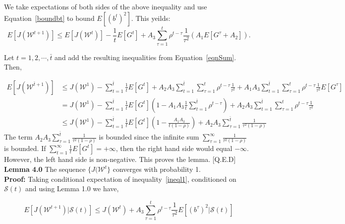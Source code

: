 We take expectations of both sides of the above inequality and use Equation~\ref{boundbt} to bound $E[(b^t)^2]$. This yeilds:
\begin{equation}
\label{eqnSum}
E[J(\mathcal{W}^{t+1})] \le E[J(\mathcal{W}^t)] - \frac{1}{t} E[G^t] + A_3 \sum_{\tau=1}^{t} \rho^{t-\tau} \frac{1}{\tau^2} (A_1 E[G^{\tau} + A_2]).
\end{equation} 

Let $t=1,2,\cdots, \bar{t}$ and add the resulting inequalities from Equation~\ref{eqnSum}. Then,

\begin{align*}
E[J(\mathcal{W}^{\bar{t}+1})] &\le J(\mathcal{W}^1) - \sum_{t=1}^{\bar{t}} \frac{1}{t} E[G^t] + A_2 A_3 \sum_{t=1}^{\bar{t}} \sum_{\tau=1}^{t} \rho^{t-\tau} \frac{1}{\tau^2} + A_1 A_3 \sum_{t=1}^{\bar{t}} \sum_{\tau=1}^{t} \rho^{t-\tau} \frac{1}{\tau^2} E[G^{\tau}]\\
   &= J(\mathcal{W}^1) - \sum_{t=1}^{\bar{t}} \frac{1}{t} E[G^t] (1 - A_1 A_3 \frac{1}{t} \sum_{t=1}^{\bar{t}} \rho^{t-\tau} ) + A_2 A_3 \sum_{t=1}^{\bar{t}} \sum_{\tau=1}^{t} \rho^{t-\tau} \frac{1}{\tau^2}\\
   &\le J(\mathcal{W}^1) - \sum_{t=1}^{\bar{t}} \frac{1}{t} E[G^t] (1 - \frac{A_1 A_3}{t(1-\rho)}) + A_2 A_3 \sum_{\tau=1}^{\bar{t}} \frac{1}{\tau^2(1-\rho)}
\end{align*}
The term $A_2 A_3 \sum_{\tau=1}^{\bar{t}} \frac{1}{\tau^2(1-\rho)}$ is bounded since the infinite sum $\sum_{\tau=1}^{\infty} \frac{1}{\tau^2(1-\rho)}$ is bounded. If $\sum_{t=1}^{\infty} \frac{1}{t} E[G^t]=+\infty$, then the right hand side would equal $-\infty$. However, the left hand side is non-negative. This proves the lemma.  [Q.E.D] \\

\noindent \textbf{Lemma 4.0} The sequence $\{J(\mathcal{W}^t\}$ converges with probability 1. \\

\noindent \textbf{Proof:} Taking conditional expectation of inequality~\ref{ineql1}, conditioned on $\mathcal{S}(t)$ and using Lemma 1.0 we have,

\begin{equation}
\label{eqSome1}
E[J(\mathcal{W}^{t+1})|\mathcal{S}(t)] \le  J(\mathcal{W}^{t}) + A_3 \sum_{\tau=1}^{t} \rho^{t-\tau} \frac{1}{\tau^2} E[(b^{\tau})^2|\mathcal{S}(t)]
\end{equation}

